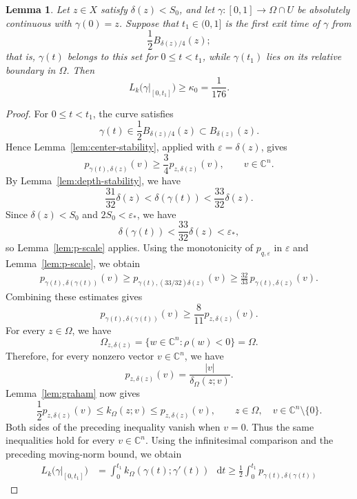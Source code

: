 \documentclass[11pt]{article}
\newtheorem{lemma}[theorem]{Lemma}
\theoremstyle{definition}
\newcommand{\C}{\mathbb{C}}
\newcommand{\eps}{\varepsilon}
\newcommand{\dd}{\mathop{}\!\mathrm{d}}
\begin{document}
\begin{lemma}\label{lem:crossing-cost}
	Let \(z\in X\) satisfy \(\delta(z)<S_0\), and let
	\(\gamma:[0,1]\to\Omega\cap U\) be absolutely continuous with
	\(\gamma(0)=z\).  Suppose that \(t_1\in(0,1]\) is the first exit time of \(\gamma\) from
	\[
	\frac12 B_{\delta(z)/4}(z);
	\]
	that is, \(\gamma(t)\) belongs to this set for \(0\le t<t_1\), while
	\(\gamma(t_1)\) lies on its relative boundary in \(\Omega\).
	Then
	\[
	L_k\bigl(\gamma|_{[0,t_1]}\bigr)\ge\kappa_0=\frac{1}{176}.
	\]
\end{lemma}

\begin{proof}
	For \(0\le t<t_1\), the curve satisfies
	\[
	\gamma(t)
	\in
	\frac12 B_{\delta(z)/4}(z)
	\subset
	B_{\delta(z)}(z).
	\]
	Hence Lemma~\ref{lem:center-stability}, applied with
	\(\eps=\delta(z)\), gives
	\[
		p_{\gamma(t),\delta(z)}(v)
		\ge
		\frac34 p_{z,\delta(z)}(v),
		\qquad v\in\C^n.
	\]
	By Lemma~\ref{lem:depth-stability}, we have
	\[
	\frac{31}{32}\delta(z)
	<
	\delta(\gamma(t))
	<
	\frac{33}{32}\delta(z).
	\]
Since \(\delta(z)<S_0\) and \(2S_0<\eps_*\), we have
\[
\delta(\gamma(t))
<
\frac{33}{32}\delta(z)
<
\eps_*,
\]
so Lemma~\ref{lem:p-scale} applies.  Using the monotonicity of \(p_{q,\eps}\) in \(\eps\) and
	Lemma~\ref{lem:p-scale}, we obtain
	\[
	\begin{aligned}
		p_{\gamma(t),\delta(\gamma(t))}(v)
		\ge
		p_{\gamma(t),(33/32)\delta(z)}(v)
		\ge
		\frac{32}{33}\,
		p_{\gamma(t),\delta(z)}(v).
	\end{aligned}
	\]
	Combining these estimates gives
	\[
		p_{\gamma(t),\delta(\gamma(t))}(v)
		\ge
		\frac8{11}p_{z,\delta(z)}(v).
	\]
For every \(z\in\Omega\), we have
\[
\Omega_{z,\delta(z)}
=
\{w\in\C^n:\rho(w)<0\}
=
\Omega.
\]
Therefore, for every nonzero vector \(v\in\C^n\), we have
\[
p_{z,\delta(z)}(v)
=
\frac{|v|}{\delta_\Omega(z;v)}.
\]
Lemma~\ref{lem:graham} now gives
\begin{equation*}
    \frac12 p_{z,\delta(z)}(v)
    \le
    k_\Omega(z;v)
    \le
    p_{z,\delta(z)}(v),
    \qquad z\in\Omega,\quad v\in\C^n\setminus\{0\}.
\end{equation*}
Both sides of the preceding inequality vanish when \(v=0\).
Thus the same inequalities hold for every \(v\in\C^n\).
Using the infinitesimal comparison and the preceding moving-norm bound,
we obtain
\[
\begin{aligned}
	L_k\bigl(\gamma|_{[0,t_1]}\bigr)
	&=
	\int_0^{t_1}
	k_\Omega(\gamma(t);\gamma'(t))\,\dd t
	\ge
	\frac12
	\int_0^{t_1}
	p_{\gamma(t),\delta(\gamma(t))}

\end{aligned}\]
\end{proof}
\end{document}
